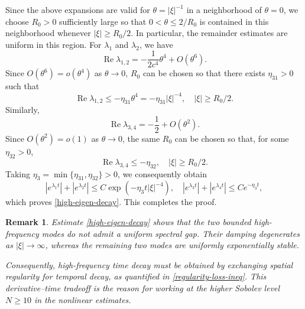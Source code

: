 \documentclass[10pt,reqno]{amsart}
\numberwithin{equation}{section}
\newtheorem{rem}{Remark}[section]
\begin{document}
Since the above expansions are valid for $\theta=|\xi|^{-1}$ in a
neighborhood of $\theta=0$, we choose $R_0>0$ sufficiently large so that
$0<\theta\le 2/R_0$ is contained in this neighborhood whenever
$|\xi|\ge R_0/2$. In particular, the remainder estimates are uniform
in this region. For $\lambda_1$ and $\lambda_2$, we have
\[
\operatorname{Re}\lambda_{1,2}
=-\frac{1}{2c^4}\theta^4+O(\theta^6).
\]
Since $O(\theta^6)=o(\theta^4)$ as $\theta\to0$, $R_0$ can be chosen
so that there exists $\eta_{31}>0$ such that
\[
\operatorname{Re}\lambda_{1,2}
\le -\eta_{31}\theta^4
=-\eta_{31}|\xi|^{-4},
\quad |\xi|\ge R_0/2.
\]
Similarly,
\[
\operatorname{Re}\lambda_{3,4}
=-\frac12+O(\theta^2).
\]
Since $O(\theta^2)=o(1)$ as $\theta\to0$, the same $R_0$ can be chosen
so that, for some $\eta_{32}>0$,
\[
\operatorname{Re}\lambda_{3,4}\le -\eta_{32},
\quad |\xi|\ge R_0/2.
\]
Taking $\eta_3 =\min\{\eta_{31},\eta_{32}\}>0$, we consequently obtain
\[
|e^{\lambda_1t}|+|e^{\lambda_2t}|
\le C\exp\left(-\eta_3  t|\xi|^{-4}\right),
\quad
|e^{\lambda_3t}|+|e^{\lambda_4t}|
\le Ce^{-\eta_3  t},
\]
which proves \eqref{high-eigen-decay}. This completes the proof.
\endproof

\begin{rem} 
Estimate \eqref{high-eigen-decay} shows that the two bounded high-frequency modes do not admit a uniform spectral gap. Their damping degenerates as $|\xi|\to\infty$, whereas the remaining two modes are uniformly exponentially stable.

Consequently, high-frequency time decay must be obtained by exchanging spatial regularity for temporal decay, as quantified in \eqref{regularity-loss-ineq}. This derivative--time tradeoff is the reason for working at the higher Sobolev level $N\ge10$ in the nonlinear estimates.
\end{rem}
\end{document}
